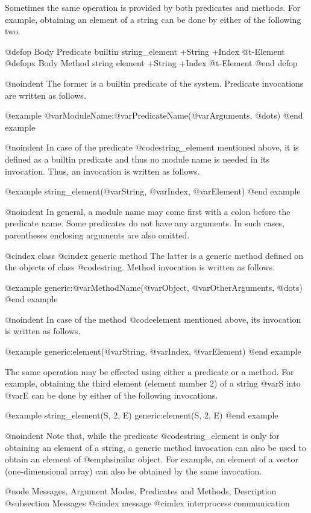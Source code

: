 Sometimes the same operation is provided by both predicates and methods.
For example, obtaining an element of a string can be done by either of
the following two.

@defop {Body Predicate} {builtin} string_element +String +Index @t{-}Element
@defopx {Body Method} string element +String +Index @t{-}Element
@end defop

@noindent
The former is a builtin predicate of the system.  Predicate invocations
are written as follows.

@example
@var{ModuleName}:@var{PredicateName}(@var{Arguments}, @dots{})
@end example

@noindent
In case of the predicate @code{string_element} mentioned above, it is
defined as a builtin predicate and thus no module name is needed in its
invocation.  Thus, an invocation is written as follows.

@example
string_element(@var{String}, @var{Index}, @var{Element})
@end example

@noindent
In general, a module name may come first with a colon before the
predicate name.  Some predicates do not have any arguments.  In such
cases, parentheses enclosing arguments are also omitted.

@cindex class
@cindex generic method
The latter is a generic method defined on the objects of class
@code{string}.  Method invocation is written as follows.

@example
generic:@var{MethodName}(@var{Object}, @var{OtherArguments, @dots{}})
@end example

@noindent
In case of the method @code{element} mentioned above, its invocation is
written as follows.

@example
generic:element(@var{String}, @var{Index}, @var{Element})
@end example

The same operation may be effected using either a predicate or a method.
For example, obtaining the third element (element number 2) of a string
@var{S} into @var{E} can be done by either of the following
invocations.

@example
string_element(S, 2, E)
generic:element(S, 2, E)
@end example

@noindent
Note that, while the predicate @code{string_element} is only for
obtaining an element of a string, a generic method invocation can also
be used to obtain an element of @emph{similar} object.  For example, an
element of a vector (one-dimensional array) can also be obtained by the
same invocation.

@node Messages, Argument Modes, Predicates and Methods, Description
@subsection Messages
@cindex message
@cindex interprocess communication

